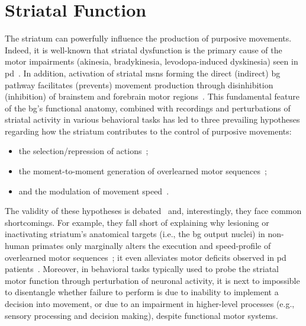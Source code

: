 \section{Striatal Function}
\label{ch:disscusion:lesion}

The striatum can powerfully influence the production of purposive movements.
Indeed, it is well-known that striatal dysfunction is the primary cause of the motor impairments (akinesia, bradykinesia, levodopa-induced dyskinesia) seen in \gls{pd}~\cite{Mink1996,McGregor2019Neuron}.
In addition, activation of striatal \glspl{msn} forming the direct (indirect) \gls{bg} pathway facilitates (prevents) movement production through disinhibition (inhibition) of brainstem and forebrain motor regions~\cite{Kravitz2010Nature}.
This fundamental feature of the \gls{bg}'s functional anatomy, combined with recordings and perturbations of striatal activity in various behavioral tasks has led to three prevailing hypotheses regarding how the striatum contributes to the control of purposive movements: %
\begin{itemize}[noitemsep]
    \item the selection/repression of actions~\cite{Barnes2005Nature, Cui2013Nature, Klaus2017Neuron, Markowitz2018Cell};
    \item the moment-to-moment generation of overlearned motor sequences~\cite{Dhawale2019};
    \item and the modulation of movement speed~\cite{Kim2014EJN, Rueda2015NN, Barbera2016Neuron, Yttri2016Nature, Panigrahi2015Cell}.
\end{itemize}
The validity of these hypotheses is debated~\cite[for instance, see][]{Dudman2016CurrOpinNeurobiol} and, interestingly, they face common shortcomings.
For example, they fall short of explaining why lesioning or inactivating striatum's anatomical targets (i.e., the \gls{bg} output nuclei) in non-human primates only marginally alters the execution and speed-profile of overlearned motor sequences~\cite{Desmurget2010JNeurosci}; it even alleviates motor deficits observed in \gls{pd} patients~\cite{Turner2010CurrOpinNeurobiol}.
Moreover, in behavioral tasks typically used to probe the striatal motor function through perturbation of neuronal activity, it is next to impossible to disentangle whether failure to perform is due to inability to implement a decision into movement, or due to an impairment in higher-level processes (e.g., sensory processing and decision making), despite functional motor systems.\footnotemark
